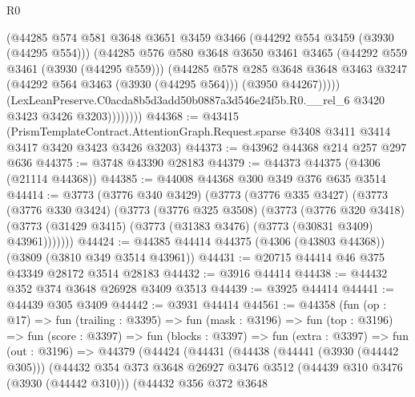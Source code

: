 \begin{lexlean}{R0}
\begin{coremodule}
                    (@44285
                      @574
                      @581
                      @3648
                      @3651
                      @3459
                      @3466
                      (@44292 @554 @3459 (@3930 (@44295 @554)))
                      (@44285
                        @576
                        @580
                        @3648
                        @3650
                        @3461
                        @3465
                        (@44292 @559 @3461 (@3930 (@44295 @559)))
                        (@44285
                          @578
                          @285
                          @3648
                          @3648
                          @3463
                          @3247
                          (@44292 @564 @3463 (@3930 (@44295 @564)))
                          (@3950 @44267)))))
                  (LexLeanPreserve.C0acda8b5d3add50b0887a3d546e24f5b.R0.__rel_6
                    @3420
                    @3423
                    @3426
                    @3203))))))))
@44368 := @43415
    (PrismTemplateContract.AttentionGraph.Request.sparse
      @3408
      @3411
      @3414
      @3417
      @3420
      @3423
      @3426
      @3203)
@44373 := @43962 @44368 @214 @257 @297 @636
@44375 := @3748 @43390 @28183
@44379 := @44373 @44375 (@4306 (@21114 @44368))
@44385 := @44008 @44368 @300 @349 @376 @635 @3514
@44414 := @3773
    (@3776 @340 @3429)
    (@3773
      (@3776 @335 @3427)
      (@3773
        (@3776 @330 @3424)
        (@3773
          (@3776 @325 @3508)
          (@3773
            (@3776 @320 @3418)
            (@3773 (@31429 @3415) (@3773 (@31383 @3476) (@3773 (@30831 @3409) @43961)))))))
@44424 := @44385 @44414 @44375 (@4306 (@43803 @44368)) (@3809 (@3810 @349 @3514 @43961))
@44431 := @20715 @44414 @46 @375 @43349 @28172 @3514 @28183
@44432 := @3916 @44414
@44438 := @44432 @352 @374 @3648 @26928 @3409 @3513
@44439 := @3925 @44414
@44441 := @44439 @305 @3409
@44442 := @3931 @44414
@44561 := @44358
    (fun (op : @17) =>
    fun (trailing : @3395) =>
    fun (mask : @3196) =>
    fun (top : @3196) =>
    fun (score : @3397) =>
    fun (blocks : @3397) =>
    fun (extra : @3397) =>
    fun (out : @3196) =>
    @44379
      (@44424
        (@44431
          (@44438
            (@44441 (@3930 (@44442 @305)))
            (@44432
              @354
              @373
              @3648
              @26927
              @3476
              @3512
              (@44439 @310 @3476 (@3930 (@44442 @310)))
              (@44432
                @356
                @372
                @3648

\end{coremodule}
\end{lexlean}
